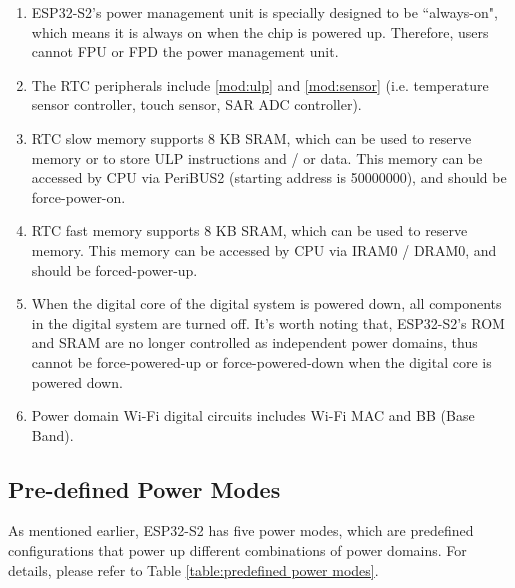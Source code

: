 \documentclass[main\_\_EN.tex]{subfiles}
\begin{document}
\begin{tiplisting}
\vspace{-2em}\label{RTC_STATUS}
\begin{enumerate}
    \item ESP32-S2's power management unit is specially designed to be ``always-on", which means it is always on when the chip is powered up. Therefore, users cannot FPU or FPD the power management unit.
    \item The RTC peripherals include \ref{mod:ulp} \textit{} and \ref{mod:sensor} \textit{} (i.e. temperature sensor controller, touch sensor, SAR ADC controller).
    \item RTC slow memory supports 8 KB SRAM, which can be used to reserve memory or to store ULP instructions and / or data. This memory can be accessed by CPU via PeriBUS2 (starting address is \hexprefix{}50000000), and should be force-power-on.
    \item RTC fast memory supports 8 KB SRAM, which can be used to reserve memory. This memory can be accessed by CPU via IRAM0 / DRAM0, and should be forced-power-up.
    \item When the digital core of the digital system is powered down, all components in the digital system are turned off. It's worth noting that, ESP32-S2's ROM and SRAM are no longer controlled as independent power domains, thus cannot be force-powered-up or force-powered-down when the digital core is powered down.
    \item Power domain Wi-Fi digital circuits includes Wi-Fi MAC and BB (Base Band).
\end{enumerate}
\end{tiplisting}

\subsection{Pre-defined Power Modes}
As mentioned earlier, ESP32-S2 has five power modes, which are predefined configurations that power up different combinations of power domains. For details, please refer to Table \ref{table:predefined power modes}.
\end{document}
